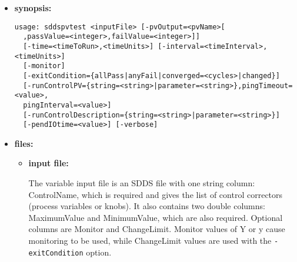 \begin{itemize}
\item {\bf synopsis:}
%
%
\begin{verbatim}
usage: sddspvtest <inputFile> [-pvOutput=<pvName>[
  ,passValue=<integer>,failValue=<integer>]]
  [-time=<timeToRun>,<timeUnits>] [-interval=<timeInterval>,<timeUnits>]
  [-monitor]
  [-exitCondition={allPass|anyFail|converged=<cycles>|changed}]
  [-runControlPV={string=<string>|parameter=<string>},pingTimeout=<value>,
  pingInterval=<value>]
  [-runControlDescription={string=<string>|parameter=<string>}]
  [-pendIOtime=<value>] [-verbose]
\end{verbatim}
\item {\bf files:}
\begin{itemize}
\item {\bf input file:} \par
The variable input file is an SDDS file with one string column: ControlName, which is required
and gives the list of control correctors (process variables or knobs). It also contains two
double columns: MaximumValue and MinimumValue, which are also required. Optional columns
are Monitor and ChangeLimit. Monitor values of Y or y cause monitoring to be used, while
ChangeLimit values are used with the \verb|-exitCondition| option.
\end{itemize}


\end{itemize}
